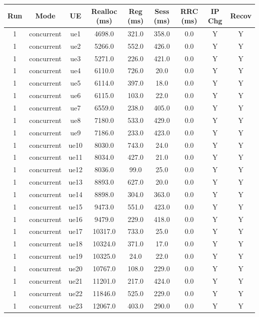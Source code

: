 \begin{table}[ht]
\centering
\begin{tabular}{|c|c|c|c|c|c|c|c|c|}
\hline
Run & Mode & UE & Realloc (ms) & Reg (ms) & Sess (ms) & RRC (ms) & IP Chg & Recov \\
\hline
1 & concurrent & ue1 & 4698.0 & 321.0 & 358.0 & 0.0 & Y & Y \\
1 & concurrent & ue2 & 5266.0 & 552.0 & 426.0 & 0.0 & Y & Y \\
1 & concurrent & ue3 & 5271.0 & 226.0 & 421.0 & 0.0 & Y & Y \\
1 & concurrent & ue4 & 6110.0 & 726.0 & 20.0 & 0.0 & Y & Y \\
1 & concurrent & ue5 & 6114.0 & 397.0 & 18.0 & 0.0 & Y & Y \\
1 & concurrent & ue6 & 6115.0 & 103.0 & 22.0 & 0.0 & Y & Y \\
1 & concurrent & ue7 & 6559.0 & 238.0 & 405.0 & 0.0 & Y & Y \\
1 & concurrent & ue8 & 7180.0 & 533.0 & 429.0 & 0.0 & Y & Y \\
1 & concurrent & ue9 & 7186.0 & 233.0 & 423.0 & 0.0 & Y & Y \\
1 & concurrent & ue10 & 8030.0 & 743.0 & 24.0 & 0.0 & Y & Y \\
1 & concurrent & ue11 & 8034.0 & 427.0 & 21.0 & 0.0 & Y & Y \\
1 & concurrent & ue12 & 8036.0 & 99.0 & 25.0 & 0.0 & Y & Y \\
1 & concurrent & ue13 & 8893.0 & 627.0 & 20.0 & 0.0 & Y & Y \\
1 & concurrent & ue14 & 8898.0 & 304.0 & 363.0 & 0.0 & Y & Y \\
1 & concurrent & ue15 & 9473.0 & 551.0 & 423.0 & 0.0 & Y & Y \\
1 & concurrent & ue16 & 9479.0 & 229.0 & 418.0 & 0.0 & Y & Y \\
1 & concurrent & ue17 & 10317.0 & 733.0 & 25.0 & 0.0 & Y & Y \\
1 & concurrent & ue18 & 10324.0 & 371.0 & 17.0 & 0.0 & Y & Y \\
1 & concurrent & ue19 & 10325.0 & 24.0 & 22.0 & 0.0 & Y & Y \\
1 & concurrent & ue20 & 10767.0 & 108.0 & 229.0 & 0.0 & Y & Y \\
1 & concurrent & ue21 & 11201.0 & 217.0 & 424.0 & 0.0 & Y & Y \\
1 & concurrent & ue22 & 11846.0 & 525.0 & 229.0 & 0.0 & Y & Y \\
1 & concurrent & ue23 & 12067.0 & 403.0 & 290.0 & 0.0 & Y & Y \\

\end{tabular}
\end{table}
